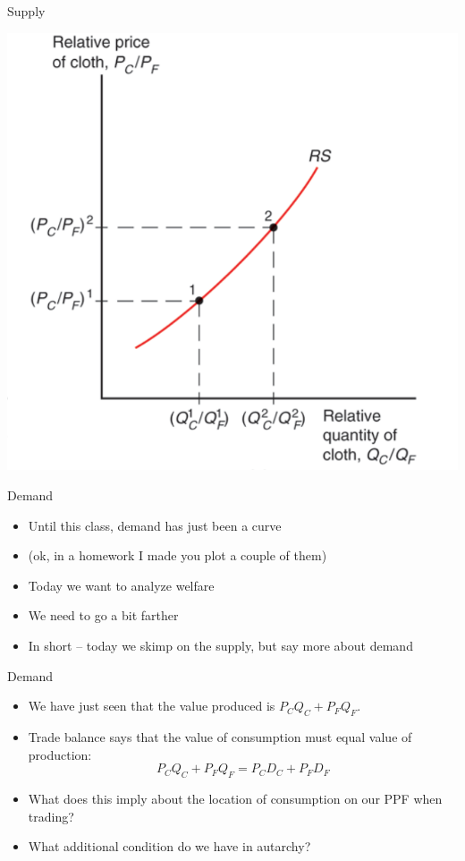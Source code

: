\documentclass[ignorenonframetext,]{beamer}
\begin{document}
\begin{frame}{Supply}

    \includegraphics[scale=0.25]{rprq.png}

\end{frame}

\begin{frame}{Demand}

    \begin{itemize}
        \item Until this class, demand has just been a curve
        \item (ok, in a homework I made you plot a couple of them)
        \item Today we want to analyze welfare 
        \item We need to go a bit farther
        \item In short -- today we skimp on the supply, but say more about demand
    \end{itemize}

\end{frame}

\begin{frame}{Demand}

    \begin{itemize}
        \item We have just seen that the value produced is $P_C Q_C + P_F Q_F$.
        \item Trade balance says that the value of consumption must equal value of production:
        \begin{equation*}
            P_C Q_C + P_F Q_F = P_C D_C + P_F D_F
        \end{equation*}
        \item What does this imply about the location of consumption on our PPF when trading?
        \item What additional condition do we have in autarchy?
    \end{itemize}

\end{frame}
\end{document}
